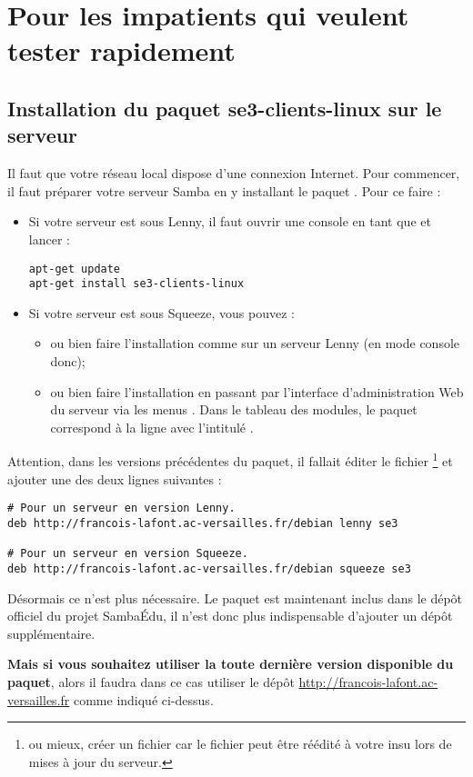 \section{Pour les impatients qui veulent tester rapidement}


\subsection{Installation du paquet se3-clients-linux sur le serveur}
\label{installation}

Il faut que votre réseau local dispose d'une connexion Internet.
Pour commencer, il faut préparer votre serveur Samba en
y installant le paquet .
Pour ce faire :

\begin{itemize}
\item Si votre serveur est sous Lenny, il faut ouvrir une
console en tant que  et lancer :
%
\begin{lstlisting}
apt-get update
apt-get install se3-clients-linux
\end{lstlisting}
%
\item Si votre serveur est sous Squeeze, vous pouvez :
\begin{itemize}
\item ou bien faire l'installation comme sur un serveur 
Lenny (en mode console donc);
\item ou bien faire l'installation en passant
par l'interface d'administration Web du serveur via les
menus  \Vers
{}. Dans le tableau des modules,
le paquet  correspond à
la ligne avec l'intitulé .

\end{itemize}
\end{itemize}

\begin{alerte}
Attention, dans les versions précédentes du paquet, il fallait
éditer le fichier %
%
\footnote{ou mieux, créer un fichier 
car le fichier  peut être réédité à votre insu
lors de mises à jour du serveur.}
%
et ajouter une des deux lignes suivantes :
%
\begin{lstlisting}
# Pour un serveur en version Lenny.
deb http://francois-lafont.ac-versailles.fr/debian lenny se3

# Pour un serveur en version Squeeze.
deb http://francois-lafont.ac-versailles.fr/debian squeeze se3
\end{lstlisting}
%
Désormais ce n'est plus nécessaire. Le paquet est
maintenant inclus dans le dépôt
officiel du projet SambaÉdu, il n'est donc plus indispensable d'ajouter un dépôt
supplémentaire. 

\textbf{Mais si vous souhaitez utiliser la toute dernière version disponible du paquet},
alors il faudra dans ce cas utiliser le dépôt \url{http://francois-lafont.ac-versailles.fr}
comme indiqué ci-dessus.
\end{alerte}

